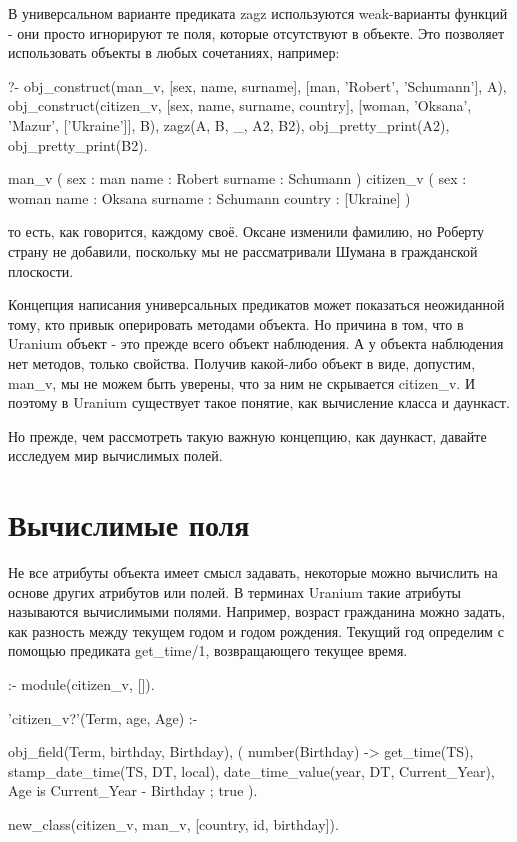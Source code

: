 \documentclass[a4paper]{book}
\def\ur{Uranium}
\begin{document}
В универсальном варианте предиката zagz используются
weak-варианты функций - они просто игнорируют те поля, которые
отсутствуют в объекте. Это позволяет использовать объекты в любых
сочетаниях, например:

\begin{example}{}{}
?- obj_construct(man_v, [sex, name, surname], 
      [man, 'Robert', 'Schumann'], A), 
   obj_construct(citizen_v, [sex, name, surname, country], 
      [woman, 'Oksana', 'Mazur', ['Ukraine']], B), 
   zagz(A, B, _, A2, B2), 
   obj_pretty_print(A2), 
   obj_pretty_print(B2).

man_v ( 
  sex : man 
  name : Robert 
  surname : Schumann 
) 
citizen_v ( 
  sex : woman 
  name : Oksana 
  surname : Schumann 
  country : [Ukraine] 
) 
\end{example}

то есть, как говорится, каждому своё. Оксане изменили фамилию, но
Роберту страну не добавили, поскольку мы не рассматривали Шумана
в гражданской плоскости.

Концепция написания универсальных предикатов может показаться
неожиданной тому, кто привык оперировать методами объекта. Но
причина в том, что в \ur{} объект - это прежде всего объект
наблюдения. А у объекта наблюдения нет методов, только
свойства. Получив какой-либо объект в виде, допустим, man_v, мы
не можем быть уверены, что за ним не скрывается citizen_v. И
поэтому в \ur{} существует такое понятие, как вычисление
класса и даункаст.

Но прежде, чем рассмотреть такую важную концепцию, как даункаст,
давайте исследуем мир вычислимых полей.

\section{Вычислимые поля}

Не все атрибуты объекта имеет смысл задавать, некоторые можно
вычислить на основе других атрибутов или полей. В терминах
\ur{} такие атрибуты называются вычислимыми полями. Например,
возраст гражданина можно задать, как разность между текущем годом
и годом рождения. Текущий год определим с помощью предиката
get_time/1, возвращающего текущее время. 

\begin{example}{}{}
:- module(citizen_v, []).

'citizen_v?'(Term, age, Age) :-

        obj_field(Term, birthday, Birthday),
        (  number(Birthday)
        -> get_time(TS),
           stamp_date_time(TS, DT, local),
           date_time_value(year, DT, Current_Year),
           Age is Current_Year - Birthday
        ;
           true
        ).
        
new_class(citizen_v, man_v, [country, id, birthday]).
\end{example}
\end{document}
